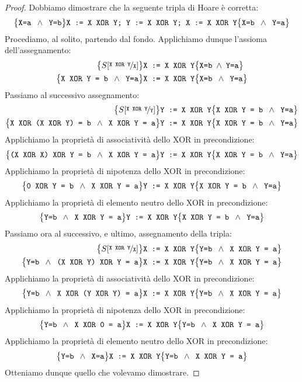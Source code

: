 \begin{proof}
Dobbiamo dimostrare che la seguente tripla di Hoare è corretta:
\[
  \bigl\{ \text{\texttt{X=a }} \land \text{\texttt{ Y=b}} \bigr\}
  \text{\texttt{X := X XOR Y; Y := X XOR Y; X := X XOR Y}}
  \bigl\{\text{\texttt{X=b }} \land \text{\texttt{ Y=a}} \bigr\}
\]
Procediamo, al solito, partendo dal fondo. Applichiamo dunque l'assioma dell'assegnamento:
\begin{align*}
  \bigl\{ S[\nicefrac{\text{\texttt{X XOR Y}}}{\text{\texttt{X}}}] \bigr\} &
  \text{\texttt{X := X XOR Y}}
  \bigl\{\text{\texttt{X=b}} \; \land \; \text{\texttt{Y=a}} \bigr\}
  \\
  \bigl\{\text{\texttt{X XOR Y = b }} \land \text{\texttt{ Y=a}}  \bigr\} &
  \text{\texttt{X := X XOR Y}}
  \bigl\{\text{\texttt{X=b }} \land \text{\texttt{ Y=a}} \bigr\}
\end{align*}
Passiamo al successivo assegnamento:
\begin{align*}
  \bigl\{ S[\nicefrac{\text{\texttt{X XOR Y}}}{\text{\texttt{Y}}} ] \bigr\} &
  \text{\texttt{Y := X XOR Y}}
  \bigl\{\text{\texttt{X XOR Y = b }} \land \text{\texttt{ Y=a}} \bigr\}
  \\
  \bigl\{ \text{\texttt{X XOR (X XOR Y) = b }} \land \text{\texttt{ X XOR Y = a}} \bigr\} &
  \text{\texttt{Y := X XOR Y}}
  \bigl\{ \text{\texttt{X XOR Y = b }} \land \text{\texttt{ Y=a}} \bigr\}
\end{align*}
Applichiamo la proprietà di associatività dello XOR in precondizione:
\[
  \bigl\{ \text{\texttt{(X XOR X) XOR Y = b }} \land \text{\texttt{ X XOR Y = a}} \bigr\}
  \texttt{Y := X XOR Y}
  \bigl\{ \text{\texttt{X XOR Y = b }} \land \text{\texttt{ Y=a}} \bigr\}
\]
Applichiamo la proprietà di nipotenza dello XOR in precondizione:
\[
  \bigl\{ \text{\texttt{0 XOR Y = b }} \land \text{\texttt{ X XOR Y = a}} \bigr\}
  \text{\texttt{Y := X XOR Y}}
  \bigl\{ \text{\texttt{X XOR Y = b }} \land \text{\texttt{ Y=a}} \bigr\}
\]
Applichiamo la proprietà di elemento neutro dello XOR in precondizione:
\[
  \bigl\{ \text{\texttt{Y=b }} \land \text{\texttt{ X XOR Y = a}} \bigr\}
  \text{\texttt{Y := X XOR Y}}
  \bigl\{ \text{\texttt{X XOR Y = b }} \land \text{\texttt{ Y=a}} \bigr\}
\]
Passiamo ora al successivo, e ultimo, assegnamento della tripla:
\begin{align*}
  \bigl\{ S[\nicefrac{\text{\texttt{X XOR Y}}}{\text{\texttt{X}}} ] \bigr\} &
  \text{\texttt{X := X XOR Y}}
  \bigl\{ \text{\texttt{Y=b }} \land \text{\texttt{ X XOR Y = a}} \bigr\}
  \\
 \bigl\{ \text{\texttt{Y=b }} \land \text{\texttt{ (X XOR Y) XOR Y = a}} \bigr\} &
  \text{\texttt{X := X XOR Y}}
  \bigl\{ \text{\texttt{Y=b }} \land \text{\texttt{ X XOR Y = a}} \bigr\}
\end{align*}
Applichiamo la proprietà di associatività dello XOR in precondizione:
\[
  \bigl\{ \text{\texttt{Y=b }} \land \text{\texttt{ X XOR (Y XOR Y) = a}} \bigr\}
  \text{\texttt{X := X XOR Y}}
  \bigl\{ \text{\texttt{Y=b }} \land \text{\texttt{ X XOR Y = a}} \bigr\}
\]
Applichiamo la proprietà di nipotenza dello XOR in precondizione:
\[
  \bigl\{ \text{\texttt{Y=b }} \land \text{\texttt{ X XOR 0 = a}} \bigr\}
  \texttt{X := X XOR Y}
  \bigl\{ \text{\texttt{Y=b }} \land \text{\texttt{ X XOR Y = a}} \bigr\}
\]
Applichiamo la proprietà di elemento neutro dello XOR in precondizione:
\[
  \bigl\{ \text{\texttt{Y=b }} \land \text{\texttt{ X=a}} \bigr\}
  \texttt{X := X XOR Y}
  \bigl\{ \text{\texttt{Y=b }} \land \text{\texttt{ X XOR Y = a}} \bigr\}
\]
Otteniamo dunque quello che volevamo dimostrare.
\end{proof}


